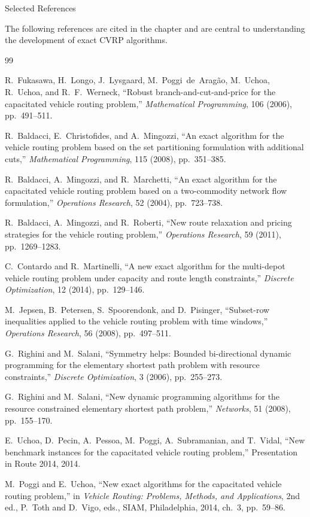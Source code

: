 \documentclass[aspectratio=169,10pt]{beamer}
\begin{document}
\begin{frame}[allowframebreaks]{Selected References}

The following references are cited in the chapter and are central to
understanding the development of exact CVRP algorithms.

{\small
\begin{thebibliography}{99}

  R.~Fukasawa, H.~Longo, J.~Lysgaard, M.~Poggi~de~Arag\~ao, M.~Uchoa,
  R.~Uchoa, and R.~F.~Werneck,
  ``Robust branch-and-cut-and-price for the capacitated vehicle routing
  problem,''
  \textit{Mathematical Programming}, 106 (2006), pp.~491--511.

  R.~Baldacci, E.~Christofides, and A.~Mingozzi,
  ``An exact algorithm for the vehicle routing problem based on the set
  partitioning formulation with additional cuts,''
  \textit{Mathematical Programming}, 115 (2008), pp.~351--385.

  R.~Baldacci, A.~Mingozzi, and R.~Marchetti,
  ``An exact algorithm for the capacitated vehicle routing problem based
  on a two-commodity network flow formulation,''
  \textit{Operations Research}, 52 (2004), pp.~723--738.

  R.~Baldacci, A.~Mingozzi, and R.~Roberti,
  ``New route relaxation and pricing strategies for the vehicle routing
  problem,''
  \textit{Operations Research}, 59 (2011), pp.~1269--1283.

  C.~Contardo and R.~Martinelli,
  ``A new exact algorithm for the multi-depot vehicle routing problem
  under capacity and route length constraints,''
  \textit{Discrete Optimization}, 12 (2014), pp.~129--146.

  M.~Jepsen, B.~Petersen, S.~Spoorendonk, and D.~Pisinger,
  ``Subset-row inequalities applied to the vehicle routing problem
  with time windows,''
  \textit{Operations Research}, 56 (2008), pp.~497--511.

  G.~Righini and M.~Salani,
  ``Symmetry helps: Bounded bi-directional dynamic programming for the
  elementary shortest path problem with resource constraints,''
  \textit{Discrete Optimization}, 3 (2006), pp.~255--273.

  G.~Righini and M.~Salani,
  ``New dynamic programming algorithms for the resource constrained
  elementary shortest path problem,''
  \textit{Networks}, 51 (2008), pp.~155--170.

  E.~Uchoa, D.~Pecin, A.~Pessoa, M.~Poggi, A.~Subramanian, and T.~Vidal,
  ``New benchmark instances for the capacitated vehicle routing problem,''
  Presentation in Route 2014, 2014.

  M.~Poggi and E.~Uchoa,
  ``New exact algorithms for the capacitated vehicle routing problem,''
  in \textit{Vehicle Routing: Problems, Methods, and Applications},
  2nd ed., P.~Toth and D.~Vigo, eds., SIAM, Philadelphia, 2014,
  ch.~3, pp.~59--86.

\end{thebibliography}
}

\end{frame}
\end{document}
